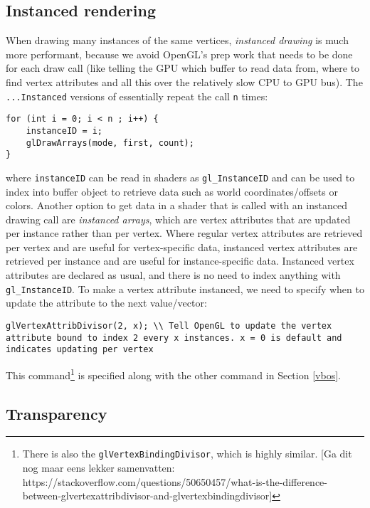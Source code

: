 \documentclass[8pt, table, xcdraw]{article}%
\begin{document}
\subsection{Instanced rendering}

When drawing many instances of the same vertices, \emph{instanced drawing} is much more performant, because we avoid OpenGL's prep work that needs to be done for each draw call (like telling the GPU which buffer to read data from, where to find vertex attributes and all this over the relatively slow CPU to GPU bus). The \lstinline{...Instanced} versions of essentially repeat the call \lstinline{n} times:

\begin{lstlisting}
for (int i = 0; i < n ; i++) {
    instanceID = i;
    glDrawArrays(mode, first, count);
}
\end{lstlisting}

where \lstinline{instanceID} can be read in shaders as \lstinline{gl_InstanceID} and can be used to index into buffer object to retrieve data such as world coordinates/offsets or colors. Another option to get data in a shader that is called with an instanced drawing call are \emph{instanced arrays}, which are vertex attributes that are updated per instance rather than per vertex. Where regular vertex attributes are retrieved per vertex and are useful for vertex-specific data, instanced vertex attributes are retrieved per instance and are useful for instance-specific data. Instanced vertex attributes are declared as usual, and there is no need to index anything with \lstinline{gl_InstanceID}. To make a vertex attribute instanced, we need to specify when to update the attribute to the next value/vector:

\begin{lstlisting}
glVertexAttribDivisor(2, x); \\ Tell OpenGL to update the vertex attribute bound to index 2 every x instances. x = 0 is default and indicates updating per vertex
\end{lstlisting}

This command\footnote{There is also the \lstinline{glVertexBindingDivisor}, which is highly similar. [Ga dit nog maar eens lekker samenvatten: https://stackoverflow.com/questions/50650457/what-is-the-difference-between-glvertexattribdivisor-and-glvertexbindingdivisor]} is specified along with the other command in Section \ref{vbos}.

\subsection{Transparency}
\end{document}
